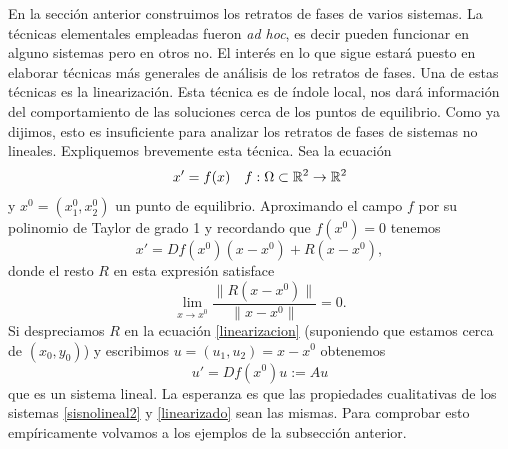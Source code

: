 En la sección anterior construimos los retratos de
fases de varios sistemas. La técnicas elementales empleadas fueron
\emph{ad hoc}, es decir pueden funcionar en alguno sistemas pero
en otros no. El interés en lo que sigue estará puesto en elaborar
técnicas más generales de análisis de los retratos de fases. Una
de estas técnicas es la linearización. Esta técnica es de índole
local, nos dará información del comportamiento de las soluciones
cerca de los puntos de equilibrio. Como ya dijimos, esto es
insuficiente para analizar los retratos de fases de sistemas no
lineales. Expliquemos brevemente esta técnica. Sea la ecuación
\begin{equation}\label{sisnolineal2}
x'=f(x)\quad f:\Omega\subset\rr^2\to\rr^2
 \end{equation}
 y $x^0=(x_1^0,x_2^0)$ un punto de equilibrio. Aproximando el campo $f$
por su polinomio de Taylor de grado 1 y recordando que $f(x^0)=0$
tenemos
\begin{equation}\label{linearizacion}
    x'=Df(x^0)(x-x^0)+R(x-x^0),
\end{equation}
donde el resto $R$ en esta expresión satisface
\[
    \lim\limits_{x\to
    x^0}\frac{\|R(x-x^0)\|}{\|x-x^0\|}=0.
\]
Si despreciamos $R$ en la ecuación \eqref{linearizacion}
(suponiendo que estamos cerca de $(x_0,y_0)$) y escribimos
$u=(u_1,u_2)=x-x^0$ obtenemos
\begin{equation}\label{linearizado}
    u'=Df(x^0)u:=Au
\end{equation}
que es un sistema lineal. La esperanza es que las propiedades
cualitativas de los sistemas \eqref{sisnolineal2} y
\eqref{linearizado} sean las mismas. Para comprobar esto
empíricamente volvamos a los ejemplos de la subsección anterior.

